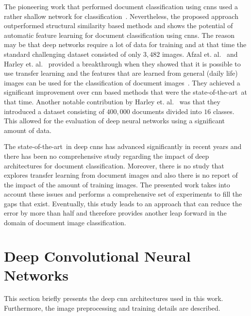 \documentclass[conference]{IEEEtran}
\newcommand*{\sota}		{state-of-the-art\ }
\begin{document}
The pioneering work that performed document classification using \ac{cnn}s used a rather shallow network for classification~\cite{lekang_14_a}. Nevertheless, the proposed approach outperformed structural similarity based methods and shows the potential of automatic feature learning for document classification using \ac{cnn}s. The reason may be that deep networks require a lot of data for training and at that time the standard challenging dataset consisted of only $3,482$ images.
Afzal et. al.~\cite{afzal2015deepdocclassifier} and Harley et. al.~\cite{harley2015evaluation} provided a breakthrough when they showed that it is possible to use transfer learning and the features that are learned from general (daily life) images can be used for the classification of document images~\cite{afzal2015deepdocclassifier}. They achieved a significant improvement over \ac{cnn} based methods that were the \sota at that time.
Another notable contribution by Harley et. al.~\cite{harley2015evaluation} was that they introduced a dataset consisting of $400,000$ documents divided into $16$ classes.
This allowed for the evaluation of deep neural networks using a significant amount of data. 

The \sota in deep \ac{cnn}s has advanced significantly in recent years and there has been no comprehensive study regarding the impact of deep architectures for document classification. Moreover, there is no study that explores transfer learning from document images and also there is no report of the impact of the amount of training images. The presented work takes into account these issues and performs a comprehensive set of experiments to fill the gaps that exist. Eventually, this study leads to an approach that can reduce the error by more than half and therefore provides another leap forward in the domain of document image classification.




 \section{Deep Convolutional Neural Networks}
\label{sec:networks}

This section briefly presents the deep \ac{cnn} architectures used in this work. Furthermore, the image preprocessing and training details are described.
\end{document}
